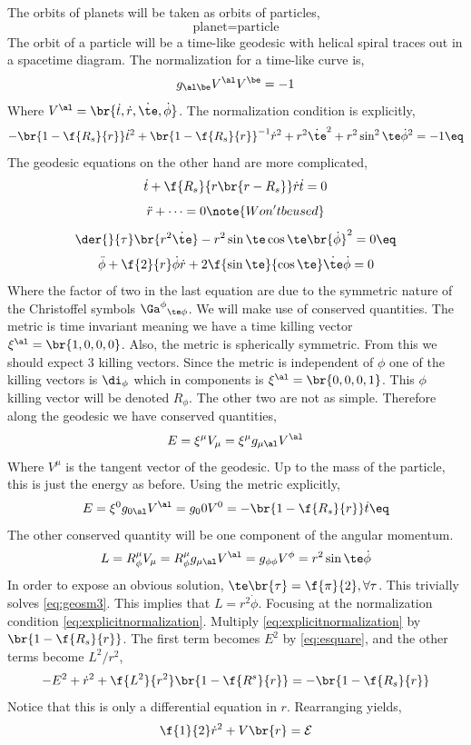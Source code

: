 \documentclass{article}
\begin{document}
The orbits of planets will be taken as orbits of particles,
\[ \text{planet} = \text{particle} \]
The orbit of a particle will be a time-like geodesic with helical spiral traces out in a spacetime diagram. The normalization for a time-like curve is,
\[g_{\al\be}V^{\al}V^{\be} = -1\]
Where $V^\al = \br{\dot{t},\dot{r},\dot{\te},\dot{\phi}}$. The normalization condition is explicitly,
\[ -\br{1-\f{R_s}{r}}\dot{t}^2 + \br{1-\f{R_s}{r}}^{-1} \dot{r}^2 + r^2 \dot{\te}^2 + r^2 \sin^2 \te \dot{\phi}^2 = -1 \eq \label{eq:explicitnormalization}\]
The geodesic equations on the other hand are more complicated,
\[ \dot{t} + \f{R_s}{r\br{r-R_s}}\dot{r}\dot{t} = 0 \]
\[ \ddot{r} + \cdots = 0 \note{Won't be used}\]
\[ \der{}{\tau} \br{r^2 \dot{\te}} - r^2 \sin \te \cos \te \br{\dot{\phi}}^2 = 0 \eq \label{eq:geosm3}\]
\[ \ddot{\phi} + \f{2}{r}\dot{\phi}\dot{r} + 2 \f{\sin\te}{\cos\te}\dot{\te}\dot{\phi} = 0 \]
Where the factor of two in the last equation are due to the symmetric nature of the Christoffel symbols ${\Ga^\phi}_{\te\phi}$. We will make use of conserved quantities. The metric is time invariant meaning we have a time killing vector $\xi^\al = \br{1,0,0,0}$. Also, the metric is spherically symmetric. From this we should expect $3$ killing vectors. Since the metric is independent of $\phi$ one of the killing vectors is $\di_\phi$ which in components is $\xi^\al = \br{0,0,0,1}$. This $\phi$ killing vector will be denoted $R_\phi$. The other two are not as simple. Therefore along the geodesic we have conserved quantities,
\[ E = \xi^\mu V_\mu = \xi^\mu g_{\mu\al}V^\al\]
Where $V^\mu$ is the tangent vector of the geodesic. Up to the mass of the particle, this is just the energy as before. Using the metric explicitly,
\[ E = \xi^0 g_{0\al}V^\al = g_00 V^0 = - \br{1 - \f{R_s}{r}}\dot{t} \eq \label{eq:esquare}\]
The other conserved quantity will be one component of the angular momentum.
\[ L = R_\phi^\mu V_\mu = R_\phi^\mu g_{\mu\al} V^\al = g_{\phi\phi} V^{\phi} = r^2 \sin \te \dot{\phi} \]
In order to expose an obvious solution, $\te\br{\tau} = \f{\pi}{2}, \forall \tau$. This trivially solves \eqref{eq:geosm3}. This implies that $L = r^2 \dot{\phi}$. Focusing at the normalization condition \eqref{eq:explicitnormalization}. Multiply \eqref{eq:explicitnormalization} by $\br{1 - \f{R_s}{r}}$. The first term becomes $E^2$ by \eqref{eq:esquare}, and the other terms become $L^2 / r^2$,
\[ - E^2 + \dot{r}^2 + \f{L^2}{r^2} \br{1 - \f{R^s}{r}} = -\br{1 - \f{R_s}{r}}\]
Notice that this is only a differential equation in $r$. Rearranging yields,
\[ \f{1}{2}\dot{r}^2 + V\br{r} = \mathcal{E} \]
\end{document}
